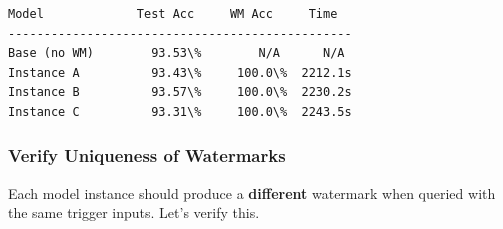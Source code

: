 \documentclass[11pt]{article}
\begin{document}
    \begin{Verbatim}[commandchars=\\\{\}]
Model             Test Acc     WM Acc     Time
------------------------------------------------
Base (no WM)        93.53\%        N/A      N/A
Instance A          93.43\%     100.0\%  2212.1s
Instance B          93.57\%     100.0\%  2230.2s
Instance C          93.31\%     100.0\%  2243.5s
    \end{Verbatim}

    \subsubsection{Verify Uniqueness of
Watermarks}\label{verify-uniqueness-of-watermarks}

Each model instance should produce a \textbf{different} watermark when
queried with the same trigger inputs. Let's verify this.
\end{document}
